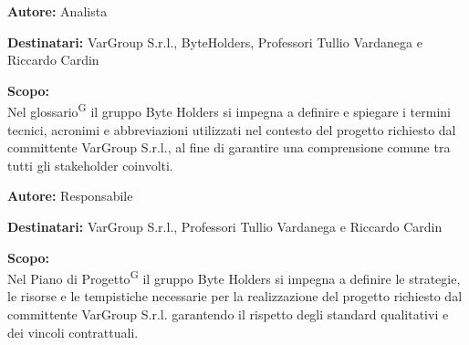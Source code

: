 \documentclass[a4paper, 11pt]{article}
\begin{document}

\begin{tcolorbox}[
    colback=LightGray,       %
    colframe=AccentColor,    %
    coltitle=white,          %
    fonttitle=\bfseries\large,
    boxrule=0.5mm,           %
    arc=2mm,                 %
    title={Glossario\textsuperscript{G}} %
]
    \textbf{\textcolor{AccentDark}{Autore:}} Analista  %
    
    \vspace{0.2cm} %
    \textbf{\textcolor{AccentDark}{Destinatari:}} VarGroup S.r.l., ByteHolders, Professori Tullio Vardanega e Riccardo Cardin

    \vspace{0.2cm} %

    \textbf{\textcolor{AccentDark}{Scopo:}} \\
    Nel glossario\textsuperscript{G} il gruppo Byte Holders si impegna a definire e spiegare i termini tecnici, acronimi e abbreviazioni utilizzati nel contesto del progetto richiesto dal committente VarGroup S.r.l., al fine di garantire una comprensione comune tra tutti gli stakeholder coinvolti.
\end{tcolorbox}



\begin{tcolorbox}[
    colback=LightGray,       %
    colframe=AccentColor,    %
    coltitle=white,          %
    fonttitle=\bfseries\large,
    boxrule=0.5mm,           %
    arc=2mm,                 %
    title={Piano di Progetto\textsuperscript{G}} %
]
    \textbf{\textcolor{AccentDark}{Autore:}} Responsabile  %
    
    \vspace{0.2cm} %
    \textbf{\textcolor{AccentDark}{Destinatari:}} VarGroup S.r.l., Professori Tullio Vardanega e Riccardo Cardin

    \vspace{0.2cm} %

    \textbf{\textcolor{AccentDark}{Scopo:}} \\
    Nel Piano di Progetto\textsuperscript{G} il gruppo Byte Holders si impegna a definire le strategie, le risorse e le tempistiche necessarie per la realizzazione del progetto richiesto dal committente VarGroup S.r.l. garantendo il rispetto degli standard qualitativi e dei vincoli contrattuali.

\end{tcolorbox}
\end{document}
